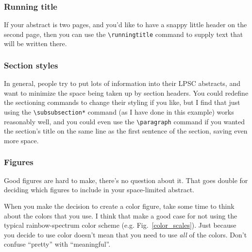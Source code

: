\documentclass[twoside]{article}
\begin{document}
\subsubsection*{Running title}

If your abstract is two pages, and you'd like to have a snappy little
header on the second page, then you can use the \verb=\runningtitle=
command to supply text that will be written there.

\subsubsection*{Section styles}

In general, people try to put lots of information into their LPSC
abstracts, and want to minimize the space being taken up by section
headers.  You could redefine the sectioning commands to change their
styling if you like, but I find that just using the \verb=\subsubsection*=
command (as I have done in this example) works reasonably well, and
you could even use the \verb=\paragraph= command if you wanted the
section's title on the same line as the first sentence of the
section, saving even more space.

\subsubsection*{Figures}

Good figures are hard to make, there's no question about it.  That
goes double for deciding which figures to include in your 
space-limited abstract.

When you make the decision to create a color figure, take some time
to think about the colors that you use.  I think that
\citet{2004EOSTr..85..385L} make a good case for not using the
typical rainbow-spectrum color scheme (e.g. Fig.~\ref{color_scales}).
Just because you decide to use color doesn't mean that you need to
use \emph{all} of the colors.  Don't confuse ``pretty'' with
``meaningful''.
\end{document}
